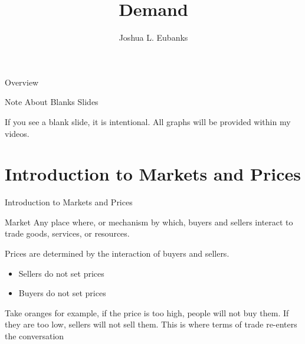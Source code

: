 \documentclass{beamer}
\title[Demand]{Demand}
\author{Joshua L. Eubanks}
\date{\vspace{-8cm}}
\begin{document}
\begin{frame}
  \titlepage
\end{frame}


\begin{frame}{Overview}
\tableofcontents
\end{frame}

\begin{frame}{Note About Blanks Slides}

\begin{alertblock}

If you see a blank slide, it is intentional.  All graphs will be provided within my videos. 
\end{alertblock}

\end{frame}

\section{Introduction to Markets and Prices}

\begin{frame}{Introduction to Markets and Prices}

\begin{block}{Market}
Any place where, or mechanism by which, buyers and sellers interact to trade goods, services, or resources.
\end{block}

Prices are determined by the interaction of buyers and sellers.

\begin{alertblock}

\begin{itemize}
\item Sellers do not set prices
\item Buyers do not set prices
\end{itemize}
\end{alertblock}

Take oranges for example, if the price is too high, people will not buy them. If they are too low, sellers will not sell them. This is where terms of trade re-enters the conversation

\end{frame}
\end{document}
